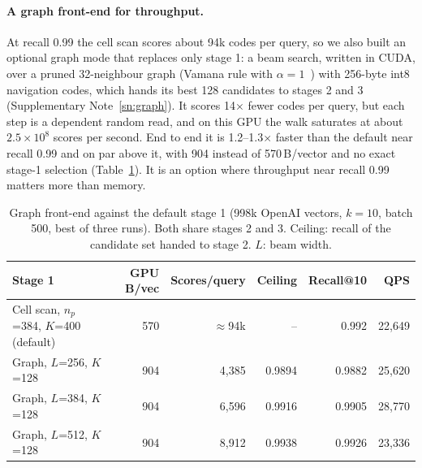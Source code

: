 \documentclass[fleqn,10pt]{wlscirep}
\begin{document}
\paragraph{A graph front-end for throughput.} At recall 0.99 the cell scan scores about 94k codes per query, so we also built an optional graph mode that replaces only stage 1: a beam search, written in CUDA, over a pruned 32-neighbour graph (Vamana rule with $\alpha=1$~\cite{subramanya2019diskann}) with 256-byte int8 navigation codes, which hands its best 128 candidates to stages 2 and 3 (Supplementary Note~\ref{sn:graph}). It scores 14$\times$ fewer codes per query, but each step is a dependent random read, and on this GPU the walk saturates at about $2.5\times10^8$ scores per second. End to end it is 1.2--1.3$\times$ faster than the default near recall 0.99 and on par above it, with 904 instead of 570\,B/vector and no exact stage-1 selection (Table~\ref{tab:graph}). It is an option where throughput near recall 0.99 matters more than memory.

\begin{table}[!htbp]
\caption{Graph front-end against the default stage 1 (998k OpenAI vectors, $k=10$, batch 500, best of three runs). Both share stages 2 and 3. Ceiling: recall of the candidate set handed to stage 2. $L$: beam width.}
\label{tab:graph}
\small
\begin{tabular}{lrrrrr}
\toprule
Stage 1 & GPU B/vec & Scores/query & Ceiling & Recall@10 & QPS \\
\midrule
Cell scan, $n_p$=384, $K$=400 (default) & 570 & $\approx$94k & -- & 0.992 & 22{,}649 \\
Graph, $L$=256, $K$=128 & 904 & 4{,}385 & 0.9894 & 0.9882 & 25{,}620 \\
Graph, $L$=384, $K$=128 & 904 & 6{,}596 & 0.9916 & 0.9905 & 28{,}770 \\
Graph, $L$=512, $K$=128 & 904 & 8{,}912 & 0.9938 & 0.9926 & 23{,}336 \\
\bottomrule
\end{tabular}
\end{table}
\end{document}
